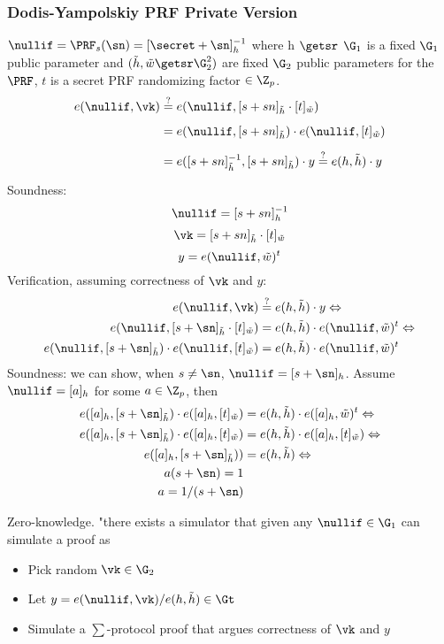 \subsubsection{Dodis-Yampolskiy PRF Private Version} 
$\nullif = \PRF_s(\sn) = [\secret + \sn]_h^{-1}$ where h $\getsr$ $\G_1$ is a fixed $\G_1$ public parameter and $(\tilde{h}, \tilde{w} \getsr \G_2^2)$ are fixed $\G_2$ public parameters for the $\PRF$, $t$ is a secret PRF randomizing factor $\in \Z_p$.
\[
    \begin{aligned}
    e(\nullif, \vk) &\stackrel{?}{=} e(\nullif, [s + sn]_{\tilde{h}} \cdot [t]_{\tilde{w}}) \\[5pt]
    &= e(\nullif, [s + sn]_{\tilde{h}}) \cdot e(\nullif, [t]_{\tilde{w}}) \\[5pt]
    &= e([s + sn]_{\tilde{h}}^{-1}, [s + sn]_{\tilde{h}}) \cdot y \stackrel{?}{=} e(h, \tilde{h}) \cdot y\\[2pt]
\end{aligned}
\]
Soundness:
\[\nullif = [s + sn]_h^{-1}\]
\[\vk = [s + sn]_{\tilde{h}}\cdot [t]_{\tilde{w}} \]
\[ y = e(\nullif, \tilde{w})^t \]
Verification, assuming correctness of $\vk$ and $y$:
\[
    \begin{aligned}
    e(\nullif, \vk) &\stackrel{?}{=} e(h,\tilde{h}) \cdot y \Leftrightarrow \\
    e(\nullif, [s + \sn]_{\tilde{h}}\cdot [t]_{\tilde{w}} ) &= e(h,\tilde{h}) \cdot e(\nullif, \tilde{w})^t \Leftrightarrow \\
    e(\nullif, [s + \sn]_{\tilde{h}}) \cdot e(\nullif,[t]_{\tilde{w}}) &= e(h,\tilde{h}) \cdot e(\nullif, \tilde{w})^t \\
\end{aligned}
\]
Soundness: we can show, when $s \neq \sn$, $\nullif = [s+\sn]_h$. Assume $\nullif = [a]_h$ for some $a \in \Z_p$, then 
\[
    \begin{aligned}
    e([a]_h, [s + \sn]_{\tilde{h}}) \cdot e([a]_h,[t]_{\tilde{w}}) &= e(h,\tilde{h}) \cdot e([a]_h, \tilde{w})^t \Leftrightarrow\\
    e([a]_h, [s + \sn]_{\tilde{h}}) \cdot e([a]_h,[t]_{\tilde{w}}) &= e(h,\tilde{h}) \cdot e([a]_h,[t]_{\tilde{w}}) \Leftrightarrow\\
    e([a]_h, [s + \sn]_{\tilde{h}})) &= e(h,\tilde{h}) \Leftrightarrow\\
    a(s + \sn) = 1\\
    a = 1/(s + \sn)
\end{aligned}
\]

Zero-knowledge. "there exists a simulator that given any $\nullif \in \G_1$ can simulate a proof as
\begin{itemize}
    \item Pick random $\vk \in \G_2$
    \item Let $y = e(\nullif, \vk) / e(h,\tilde{h}) \in \Gt$
    \item Simulate a $\sum$-protocol proof that argues correctness of $\vk$ and $y$
\end{itemize}

